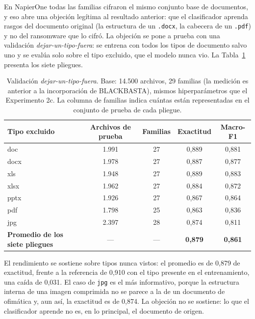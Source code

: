 En NapierOne todas las familias cifraron el mismo conjunto base de documentos, y eso abre una objeción legítima al resultado anterior: que el clasificador aprenda rasgos del documento original (la estructura de un \texttt{.docx}, la cabecera de un \texttt{.pdf}) y no del ransomware que lo cifró. La objeción se pone a prueba con una validación \textit{dejar-un-tipo-fuera}: se entrena con todos los tipos de documento salvo uno y se evalúa solo sobre el tipo excluido, que el modelo nunca vio. La Tabla~\ref{tab:exp2c_tipos} presenta los siete pliegues.

\begin{table}[ht]
\centering
\caption{Validación \textit{dejar-un-tipo-fuera}. Base: 14.500 archivos, 29 familias (la medición es anterior a la incorporación de BLACKBASTA), mismos hiperparámetros que el Experimento 2c. La columna de familias indica cuántas están representadas en el conjunto de prueba de cada pliegue.}
\label{tab:exp2c_tipos}
\small
\begin{tabular}{|l|c|c|c|c|}
\hline
\textbf{Tipo excluido} & \textbf{Archivos de prueba} & \textbf{Familias} & \textbf{Exactitud} & \textbf{Macro-F1} \\
\hline
doc & 1.991 & 27 & 0,889 & 0,881 \\
docx & 1.978 & 27 & 0,887 & 0,877 \\
xls & 1.948 & 27 & 0,889 & 0,883 \\
xlsx & 1.962 & 27 & 0,884 & 0,872 \\
pptx & 1.926 & 27 & 0,867 & 0,864 \\
pdf & 1.798 & 25 & 0,863 & 0,836 \\
jpg & 2.397 & 28 & 0,874 & 0,811 \\
\hline
\textbf{Promedio de los siete pliegues} & --- & --- & \textbf{0,879} & \textbf{0,861} \\
\hline
\end{tabular}
\end{table}

El rendimiento se sostiene sobre tipos nunca vistos: el promedio es de 0,879 de exactitud, frente a la referencia de 0,910 con el tipo presente en el entrenamiento, una caída de 0,031. El caso de \texttt{jpg} es el más informativo, porque la estructura interna de una imagen comprimida no se parece a la de un documento de ofimática y, aun así, la exactitud es de 0,874. La objeción no se sostiene: lo que el clasificador aprende no es, en lo principal, el documento de origen.

